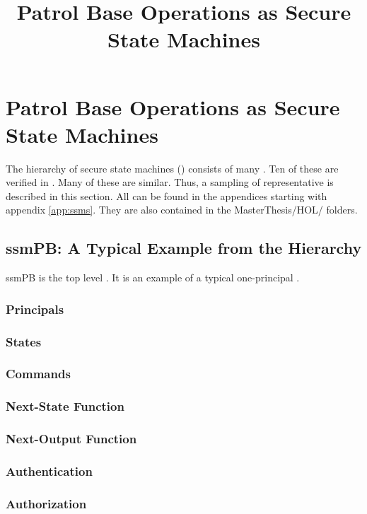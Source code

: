 \documentclass[../../main/main.tex]{subfiles}
\begin{document}
\title{Patrol Base Operations as Secure State Machines}


\chapter{Patrol Base Operations as Secure State Machines} \label{chp:pbssm}
The hierarchy of secure state machines () consists of many .  Ten of these  are verified in .  Many of these  are similar.  Thus, a sampling of representative  is described in this section.  All  can be found in the appendices starting with appendix \ref{app:ssms}.  They are also contained in the MasterThesis/HOL/ folders.

\section{ssmPB: A Typical Example from the Hierarchy}\label{sec:ssmpb}
ssmPB is the top level .  It is an example of a typical one-principal .

\subsection{Principals}
\subsection{States}
\subsection{Commands}
\subsection{Next-State Function}


\subsection{Next-Output Function}

\subsection{Authentication}
\subsection{Authorization}
\end{document}
